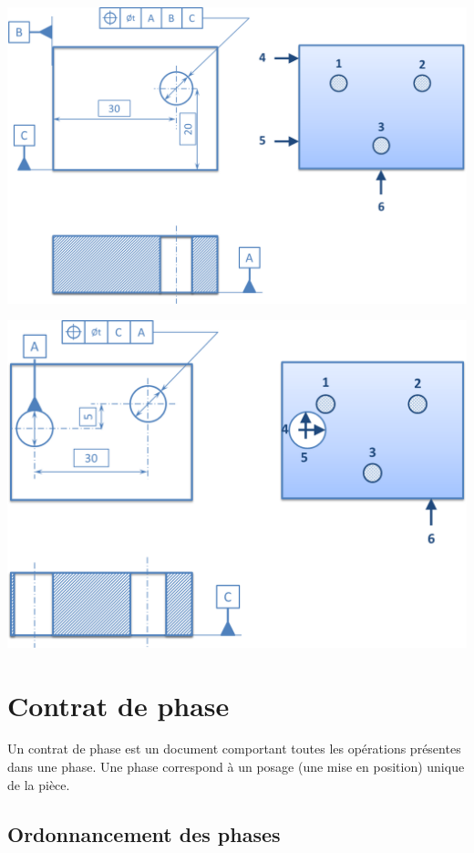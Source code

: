 \documentclass[11pt,oneside]{article}
\begin{document}
\begin{center}
\includegraphics[width=.8\textwidth]{png/MIP_1}
\end{center}


\begin{center}
\includegraphics[width=.8\textwidth]{png/MIP_2}
\end{center}








\section{Contrat de phase}
\begin{defi}
Un contrat de phase est un document comportant toutes les opérations présentes dans une phase. Une phase correspond à un posage (une mise en position) unique de la pièce.
\end{defi}


\subsection{Ordonnancement des phases}
\end{document}
